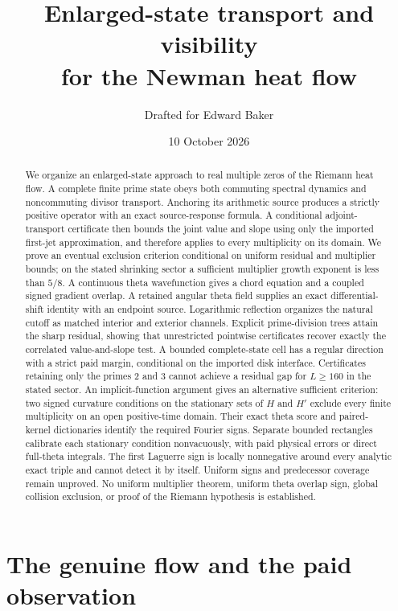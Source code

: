 \documentclass[11pt]{article}
\title{Enlarged-state transport and visibility\texorpdfstring{\\}{ }for the Newman heat flow}
\author{Drafted for Edward Baker}
\date{10 October 2026}
\theoremstyle{definition}
\theoremstyle{remark}
\begin{document}
\maketitle
\begin{abstract}
We organize an enlarged-state approach to real multiple zeros of the
Riemann heat flow. A complete finite prime state obeys both commuting
spectral dynamics and noncommuting divisor transport. Anchoring its
arithmetic source produces a strictly positive operator with an exact
source-response formula. A conditional adjoint-transport certificate then
bounds the joint value and slope using only the imported first-jet
approximation, and therefore applies to every multiplicity on its domain.
We prove an eventual exclusion criterion conditional on uniform residual
and multiplier bounds; on the stated shrinking sector a sufficient
multiplier growth exponent is less than $5/8$.
A continuous theta wavefunction gives a chord equation and a coupled
signed gradient overlap. A retained angular theta field supplies an exact
differential-shift identity with an endpoint source. Logarithmic reflection
organizes the natural cutoff as matched interior and exterior channels.
Explicit prime-division trees attain the sharp residual, showing that
unrestricted pointwise certificates recover exactly the correlated
value-and-slope test. A bounded complete-state cell has a regular
direction with a strict paid margin, conditional on the imported disk
interface. Certificates retaining only the primes 2 and 3 cannot achieve
a residual gap for $L\ge160$ in the stated sector.
An implicit-function argument gives an alternative sufficient criterion:
two signed curvature conditions on the stationary sets of $H$ and $H'$
exclude every finite multiplicity on an open positive-time domain.
Their exact theta score and paired-kernel dictionaries identify the
required Fourier signs. Separate bounded rectangles calibrate each
stationary condition nonvacuously, with paid physical errors or direct
full-theta integrals. The first Laguerre sign is locally nonnegative
around every analytic exact triple and cannot detect it by itself.
Uniform signs and predecessor coverage remain unproved.
No uniform multiplier theorem, uniform theta overlap sign, global
collision exclusion, or proof of the Riemann hypothesis is established.
\end{abstract}

\section{The genuine flow and the paid observation}
\label{sec:flow}
\end{document}
